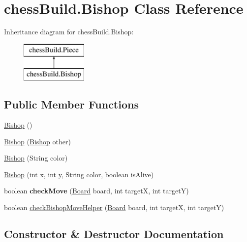 \hypertarget{classchess_build_1_1_bishop}{}\section{chess\+Build.\+Bishop Class Reference}
\label{classchess_build_1_1_bishop}
Inheritance diagram for chess\+Build.\+Bishop\+:\begin{figure}[H]
\begin{center}
\leavevmode
\includegraphics[height=2.000000cm]{classchess_build_1_1_bishop}
\end{center}
\end{figure}
\subsection*{Public Member Functions}
\begin{DoxyCompactItemize}
\item 
\hyperlink{classchess_build_1_1_bishop_abcd27a8cfe14ac745b82b1235975dfe5}{Bishop} ()
\item 
\hyperlink{classchess_build_1_1_bishop_abd25029ee4ece2514a31704c77136eab}{Bishop} (\hyperlink{classchess_build_1_1_bishop}{Bishop} other)
\item 
\hyperlink{classchess_build_1_1_bishop_a89d83da5ab8ceb0fc56b16684009631e}{Bishop} (String color)
\item 
\hyperlink{classchess_build_1_1_bishop_a33e408253263931181c912a9addf6e2b}{Bishop} (int x, int y, String color, boolean is\+Alive)
\item 
\mbox{\label{classchess_build_1_1_bishop_a349fcd0bc55597d24908a45bd200e685}} 
boolean {\bfseries check\+Move} (\hyperlink{classchess_build_1_1_board}{Board} board, int targetX, int targetY)
\item 
boolean \hyperlink{classchess_build_1_1_bishop_a59cd9646587b373feff0cd2e743fa434}{check\+Bishop\+Move\+Helper} (\hyperlink{classchess_build_1_1_board}{Board} board, int targetX, int targetY)
\end{DoxyCompactItemize}


\subsection{Constructor \& Destructor Documentation}
\mbox{\label{classchess_build_1_1_bishop_abcd27a8cfe14ac745b82b1235975dfe5}} 
